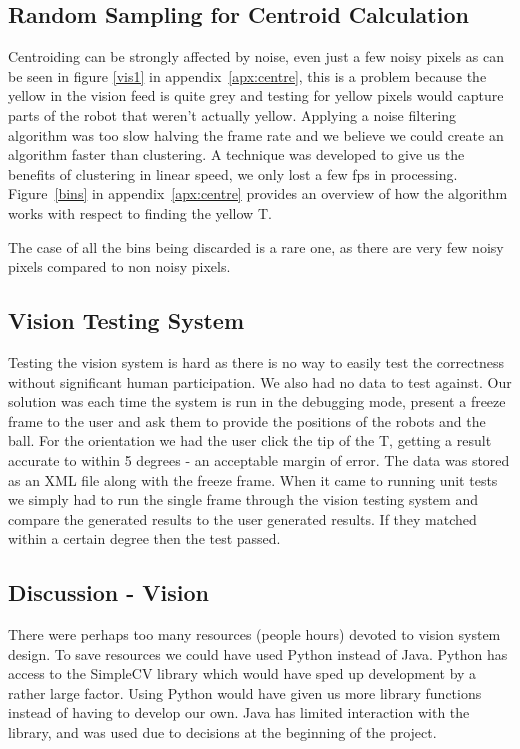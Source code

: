 \subsection{Random Sampling for Centroid Calculation}

Centroiding can be strongly affected by noise, even just a few noisy pixels as
can be seen in figure \ref{vis1} in appendix~\ref{apx:centre}, this is
a problem  because the yellow in the vision feed is quite grey and testing for
yellow pixels would capture parts of the robot that weren't actually yellow.
Applying a noise filtering algorithm was too slow halving the frame rate and we
believe we could create an algorithm faster than clustering.  A technique was
developed to give us the benefits of clustering in linear speed, we only lost
a few fps in processing.  Figure~\ref{bins} in appendix~\ref{apx:centre}
provides an overview of how the algorithm works with respect to finding the
yellow T.

The case of all the bins being discarded is a rare one, as there are very few
noisy pixels compared to non noisy pixels.  

\subsection{Vision Testing System}

Testing the vision system is hard as there is no way to easily test the
correctness without significant human participation. We also had no data to
test against.  Our solution was each time the system is run in the debugging
mode, present a freeze frame to the user and ask them to provide the positions
of the robots and the ball. For the orientation we had the user click the tip
of the T, getting a result accurate to within 5 degrees - an acceptable margin
of error. The data was stored as an XML file along with the freeze frame. When
it came to running unit tests we simply had to run the single frame through the
vision testing system and compare the generated results to the user generated
results. If they matched within a certain degree then the test passed. 

\subsection{Discussion - Vision}

There were perhaps too many resources (people hours) devoted to vision system
design.  To save resources we could have used Python instead of Java. Python
has access to the SimpleCV library which would have sped up development by
a rather large factor.  Using Python would have given us more library functions
instead of having to develop our own. Java has limited interaction with the
library, and was used due to decisions at the beginning of the project.
